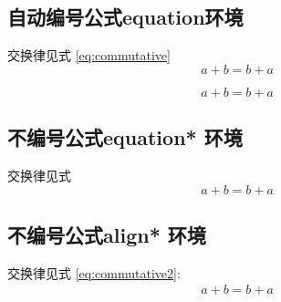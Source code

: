\documentclass{ctexart}
\begin{document}
	
	\subsection{自动编号公式equation环境 }
 交换律见式 \ref{eq:commutative} 
	\begin{equation}
		a+b=b+a 
	\end{equation}

	 \begin{equation}
	 	a+b=b+a  \label{eq:commutative}
	 \end{equation}
	
	
	\subsection{不编号公式equation* 环境}	
	交换律见式%
	\begin{equation*} 
		a+b=b+a  
	\end{equation*}

	\subsection{不编号公式align* 环境}	
交换律见式 \ref{eq:commutative2}:	
\begin{align*} 
	a+b=b+a   \label{eq:commutative2}
\end{align*}
\end{document}
